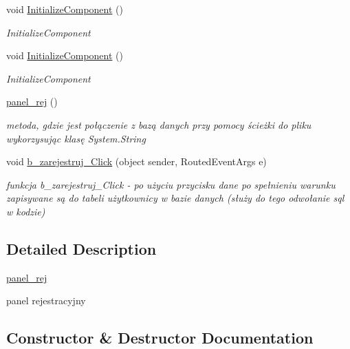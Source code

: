 \begin{DoxyCompactItemize}
void \mbox{\hyperlink{classprojekt_1_1panel__rej_a603f590d84827e1d551b3f781d6c1f28}{Initialize\+Component}} ()
\begin{DoxyCompactList}\small\item\em Initialize\+Component \end{DoxyCompactList}\item 
void \mbox{\hyperlink{classprojekt_1_1panel__rej_a603f590d84827e1d551b3f781d6c1f28}{Initialize\+Component}} ()
\begin{DoxyCompactList}\small\item\em Initialize\+Component \end{DoxyCompactList}\item 
\mbox{\hyperlink{classprojekt_1_1panel__rej_ac8e3a97468a6c4fe9f49b37721a7e265}{panel\+\_\+rej}} ()
\begin{DoxyCompactList}\small\item\em metoda, gdzie jest połączenie z bazą danych przy pomocy ścieżki do pliku wykorzysując klasę System.\+String \end{DoxyCompactList}\item 
void \mbox{\hyperlink{classprojekt_1_1panel__rej_aea82627753b6eee1ed0fef05c784fadc}{b\+\_\+zarejestruj\+\_\+\+Click}} (object sender, Routed\+Event\+Args e)
\begin{DoxyCompactList}\small\item\em funkcja b\+\_\+zarejestruj\+\_\+\+Click -\/ po użyciu przycisku dane po spełnieniu warunku zapisywane są do tabeli użytkownicy w bazie danych (służy do tego odwołanie sql w kodzie) \end{DoxyCompactList}\end{DoxyCompactItemize}


\subsection{Detailed Description}
\mbox{\hyperlink{classprojekt_1_1panel__rej}{panel\+\_\+rej}} 

panel rejestracyjny 

\subsection{Constructor \& Destructor Documentation}
\mbox{\label{classprojekt_1_1panel__rej_ac8e3a97468a6c4fe9f49b37721a7e265}} 
